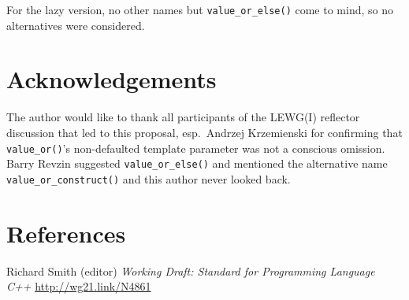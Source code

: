 \documentclass[11pt]{article}
\begin{document}
For the lazy version, no other names but \texttt{value\_or\_else()}
come to mind, so no alternatives were considered.

\section{Acknowledgements}

The author would like to thank all participants of the LEWG(I)
reflector discussion that led to this proposal, esp.\ Andrzej
Krzemienski for confirming that \texttt{value\_or()}'s non-defaulted
template parameter was not a conscious omission. Barry Revzin
suggested \texttt{value\_or\_else()} and mentioned the alternative
name \texttt{value\_or\_construct()} and this author never looked
back.

\section{References}
\renewcommand{\section}[2]{}%
\begin{thebibliography}{9}
  Richard Smith (editor)\newline
  \emph{Working Draft: Standard for Programming Language C++}\newline
  \url{http://wg21.link/N4861}
\end{thebibliography}
\end{document}
